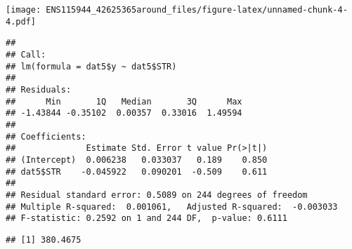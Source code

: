 \documentclass[
]{article}
\newenvironment{Shaded}{\begin{snugshade}}{\end{snugshade}}
\newcommand{\CommentTok}[1]{\textcolor[rgb]{0.56,0.35,0.01}{\textit{#1}}}
\newcommand{\KeywordTok}[1]{\textcolor[rgb]{0.13,0.29,0.53}{\textbf{#1}}}
\newcommand{\NormalTok}[1]{#1}
\newcommand{\OperatorTok}[1]{\textcolor[rgb]{0.81,0.36,0.00}{\textbf{#1}}}
\newcommand{\StringTok}[1]{\textcolor[rgb]{0.31,0.60,0.02}{#1}}
\begin{document}
\texttt{[image: ENS115944\_42625365around\_files/figure-latex/unnamed-chunk-4-4.pdf]}

\begin{Shaded}
\end{Shaded}

\begin{verbatim}
## 
## Call:
## lm(formula = dat5$y ~ dat5$STR)
## 
## Residuals:
##      Min       1Q   Median       3Q      Max 
## -1.43844 -0.35102  0.00357  0.33016  1.49594 
## 
## Coefficients:
##              Estimate Std. Error t value Pr(>|t|)
## (Intercept)  0.006238   0.033037   0.189    0.850
## dat5$STR    -0.045922   0.090201  -0.509    0.611
## 
## Residual standard error: 0.5089 on 244 degrees of freedom
## Multiple R-squared:  0.001061,   Adjusted R-squared:  -0.003033 
## F-statistic: 0.2592 on 1 and 244 DF,  p-value: 0.6111
\end{verbatim}

\begin{Shaded}
\end{Shaded}

\begin{verbatim}
## [1] 380.4675
\end{verbatim}
\end{document}
